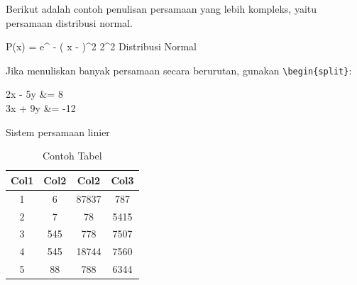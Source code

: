 Berikut adalah contoh penulisan persamaan yang lebih kompleks, yaitu persamaan distribusi normal. \par

\begin{equationcaptioned}[eq:2.mae]{
		P(x) = e^{{{ - \left( {x - \mu } \right)^2 }  {2\sigma ^2 }}}
	}{
		Distribusi Normal
	}
\end{equationcaptioned}

Jika menuliskan banyak persamaan secara berurutan, gunakan  \verb|\begin{split}|: \par

\begin{equationcaptioned}[eq:2.mae]{
		\begin{split} 
			2x - 5y &=  8 \\ 
			3x + 9y &=  -12
		\end{split}
	}{
		Sistem persamaan linier
	}
\end{equationcaptioned}


	\begin{longtable}{|c|c|c|c|}
		\caption{Contoh Tabel}
		\label{table:2.contoh}\\
		\hline
		Col1 & Col2 & Col2 & Col3 \\
		\hline
		\endhead
		1 & 6 & 87837 & 787 \\ 
		\hline
		2 & 7 & 78 & 5415 \\
		\hline
		3 & 545 & 778 & 7507 \\
		\hline
		4 & 545 & 18744 & 7560 \\
		\hline
		5 & 88 & 788 & 6344 \\
		\hline
	\end{longtable}